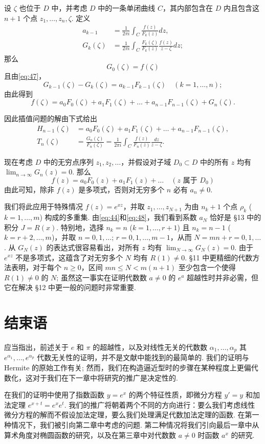 设 $\zeta$ 也位于 $D$ 中，并考虑 $D$ 中的一条单闭曲线 $C$，其内部包含在 $D$ 内且包含这 $n+1$ 个点 $z_1, \ldots, z_n, \zeta$. 定义
\begin{equation} \begin{aligned} a_{k-1} &= \frac{1}{2\pi i} \int_C \frac{f(z)}{F_k(z)} dz, \\ G_k(\zeta) &= \frac{1}{2\pi i} \int_C \frac{F_k(\zeta)}{F_k(z)} \frac{f(z)}{z-\zeta} dz; \end{aligned} \tag{48}\label{eq:48} \end{equation}
那么
\[ G_0(\zeta) = f(\zeta) \]
且由\eqref{eq:47}，
\[ G_{k-1}(\zeta) - G_k(\zeta) = a_{k-1}F_{k-1}(\zeta) \quad (k=1,\dots,n); \]
由此得到
\[ f(\zeta) = a_0 F_0(\zeta) + a_1 F_1(\zeta) + \dots + a_{n-1} F_{n-1}(\zeta) + G_n(\zeta). \]

因此插值问题的解由下式给出
\[ \begin{aligned} H_{n-1}(\zeta) &= a_0 F_0(\zeta) + a_1 F_1(\zeta) + \dots + a_{n-1} F_{n-1}(\zeta), \\ T_n(\zeta) &= \frac{G_n(\zeta)}{F_n(\zeta)} = \frac{1}{2\pi i} \int_C \frac{f(z)}{F_n(z)} \frac{dz}{z - \zeta}. \end{aligned} \]

现在考虑 $D$ 中的无穷点序列 $z_1, z_2, \dots$，并假设对子域 $D_0 \subset D$ 中的所有 $z$ 均有 $\lim_{n \to \infty} G_n(z) = 0$. 那么
\[ f(z) = a_0 F_0(z) + a_1 F_1(z) + \dots \quad (z \text{ 属于 } D_0) \]
由此可知，除非 $f(z)$ 是多项式，否则对无穷多个 $n$ 必有 $a_n \neq 0$.

我们将此应用于特殊情况 $f(z) = e^{xz}$，并取 $z_1, \dots, z_{N+1}$ 为由 $n_k+1$ 个点 $\rho_k$ ($k=1,\dots,m$) 构成的多重集. 由\eqref{eq:44}和\eqref{eq:48}，我们看到系数 $a_N$ 恰好是 \S 13 中的积分 $J = R(x)$. 特别地，选择 $n_k = n$ ($k=1,\dots,r+1$) 且 $n_k = n-1$ ($k=r+2,\dots,m$)，并取 $n = 0, 1, \dots$; $r = 0, 1, \dots, m-1$，从而 $N = mn+r = 0, 1, \dots$. 从 $G_N(z)$ 的表达式很容易看出，对所有 $z$ 均有 $\lim_{N \to \infty} G_N(z) = 0$. 由于 $e^{xz}$ 不是多项式，这蕴含了对无穷多个 $N$ 均有 $R(1) \neq 0$. \S 11 中更精细的代数方法表明，对于每个 $n \geq 0$，区间 $mn \leq N < m(n+1)$ 至少包含一个使得 $R(1) \neq 0$ 的 $N$; 虽然这一事实在证明代数数 $a \neq 0$ 的 $e^a$ 超越性时并非必需，但它在解决 \S 12 中更一般的问题时非常重要.

\section{结束语}

应当指出，前述关于 $e$ 和 $\pi$ 的超越性，以及对线性无关的代数数 $\alpha_1, \dots, \alpha_p$ 其 $e^{\alpha_1}, \dots, e^{\alpha_p}$ 代数无关性的证明，并不是文献中能找到的最简单的. 我们的证明与 Hermite 的原始工作有关; 然而，我们在构造逼近型时的步骤在某种程度上更偏代数化，这对于我们在下一章中将研究的推广是决定性的.

在我们的证明中使用了指数函数 $y = e^x$ 的两个特征性质，即微分方程 $y' = y$ 和加法定理 $e^{x+t} = e^x e^t$. 我们的推广将朝着两个不同的方向进行：要么我们考虑线性微分方程的解而不假设加法定理，要么我们处理满足代数加法定理的函数. 在第一种情况下，我们被引向第二章中考虑的问题. 第二种情况将我们引向最后一章中从算术角度对椭圆函数的研究，以及在第三章中对代数数 $a \neq 0$ 时函数 $a^x$ 的研究.
